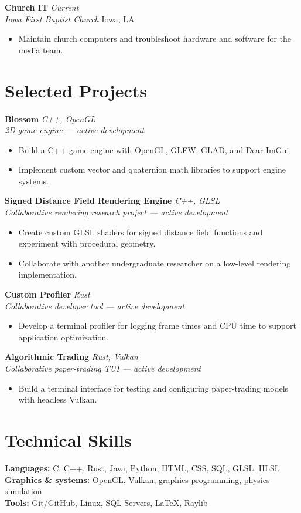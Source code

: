 \documentclass[10pt,letterpaper]{article}
\newcommand{\entry}[4]{
  \textbf{#1} \hfill \textit{#2}\\
  \textit{#3} \hfill #4\\[1.5pt]
}
\begin{document}
\entry{Church IT}{Current}{Iowa First Baptist Church}{Iowa, LA}
\begin{itemize}
  \item Maintain church computers and troubleshoot hardware and software for the media team.
\end{itemize}

\section{Selected Projects}
\textbf{Blossom} \hfill \textit{C++, OpenGL}\\
\textit{2D game engine --- active development}
\begin{itemize}
  \item Build a C++ game engine with OpenGL, GLFW, GLAD, and Dear ImGui.
  \item Implement custom vector and quaternion math libraries to support engine systems.
\end{itemize}

\textbf{Signed Distance Field Rendering Engine} \hfill \textit{C++, GLSL}\\
\textit{Collaborative rendering research project --- active development}
\begin{itemize}
  \item Create custom GLSL shaders for signed distance field functions and experiment with procedural geometry.
  \item Collaborate with another undergraduate researcher on a low-level rendering implementation.
\end{itemize}

\textbf{Custom Profiler} \hfill \textit{Rust}\\
\textit{Collaborative developer tool --- active development}
\begin{itemize}
  \item Develop a terminal profiler for logging frame times and CPU time to support application optimization.
\end{itemize}

\textbf{Algorithmic Trading} \hfill \textit{Rust, Vulkan}\\
\textit{Collaborative paper-trading TUI --- active development}
\begin{itemize}
  \item Build a terminal interface for testing and configuring paper-trading models with headless Vulkan.
\end{itemize}

\section{Technical Skills}
\textbf{Languages:} C, C++, Rust, Java, Python, HTML, CSS, SQL, GLSL, HLSL\\
\textbf{Graphics \& systems:} OpenGL, Vulkan, graphics programming, physics simulation\\
\textbf{Tools:} Git/GitHub, Linux, SQL Servers, LaTeX, Raylib
\end{document}
